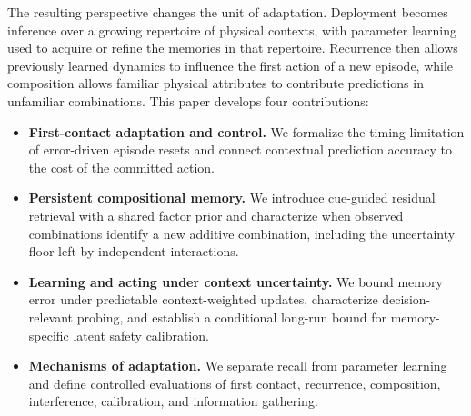 The resulting perspective changes the unit of adaptation. Deployment becomes inference over a growing repertoire of physical contexts, with parameter learning used to acquire or refine the memories in that repertoire. Recurrence then allows previously learned dynamics to influence the first action of a new episode, while composition allows familiar physical attributes to contribute predictions in unfamiliar combinations. This paper develops four contributions:
\begin{itemize}[leftmargin=*]
  \item \textbf{First-contact adaptation and control.} We formalize the timing limitation of error-driven episode resets and connect contextual prediction accuracy to the cost of the committed action.
  \item \textbf{Persistent compositional memory.} We introduce cue-guided residual retrieval with a shared factor prior and characterize when observed combinations identify a new additive combination, including the uncertainty floor left by independent interactions.
  \item \textbf{Learning and acting under context uncertainty.} We bound memory error under predictable context-weighted updates, characterize decision-relevant probing, and establish a conditional long-run bound for memory-specific latent safety calibration.
  \item \textbf{Mechanisms of adaptation.} We separate recall from parameter learning and define controlled evaluations of first contact, recurrence, composition, interference, calibration, and information gathering.
\end{itemize}
